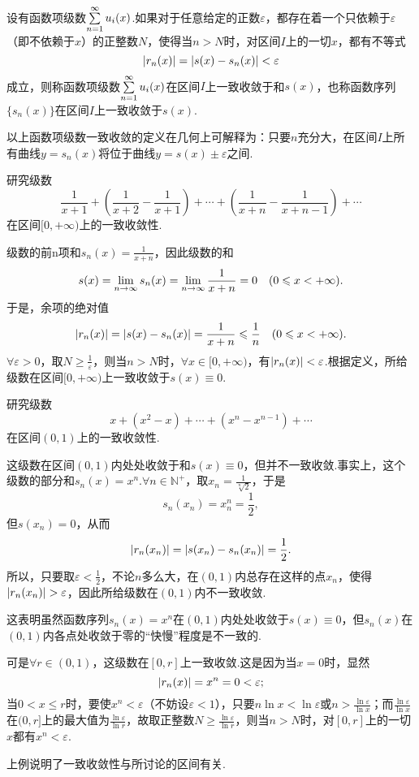 \begin{definition}
设有函数项级数\(\sum\limits_{n=1}^{\infty} u_i(x)\).如果对于任意给定的正数\(\varepsilon\)，都存在着一个只依赖于\(\varepsilon\)（即不依赖于\(x\)）的正整数\(N\)，使得当\(n>N\)时，对区间\(I\)上的一切\(x\)，都有不等式\[
\abs{r_n(x)} = \abs{s(x) - s_n(x)} < \varepsilon
\]成立，则称函数项级数\(\sum\limits_{n=1}^{\infty} u_i(x)\)在区间\(I\)上一致收敛于和\(s(x)\)，也称函数序列\(\{s_n(x)\}\)在区间\(I\)上一致收敛于\(s(x)\).
\end{definition}
以上函数项级数一致收敛的定义在几何上可解释为：只要\(n\)充分大，在区间\(I\)上所有曲线\(y = s_n(x)\)将位于曲线\(y = s(x) \pm \varepsilon\)之间.

\begin{example}
研究级数\[
\frac{1}{x+1} + \left(\frac{1}{x+2}-\frac{1}{x+1}\right)
+ \dotsb + \left(\frac{1}{x+n}-\frac{1}{x+n-1}\right) + \dotsb
\]在区间\([0,+\infty)\)上的一致收敛性.
\begin{solution}
级数的前n项和\(s_n(x) = \frac{1}{x+n}\)，因此级数的和\[
s(x) = \lim\limits_{n\to\infty} s_n(x) = \lim\limits_{n\to\infty} \frac{1}{x+n} = 0
\quad(0 \leqslant x < +\infty).
\]于是，余项的绝对值\[
\abs{r_n(x)} = \abs{s(x) - s_n(x)}
= \frac{1}{x+n} \leqslant \frac{1}{n}
\quad(0 \leqslant x < +\infty).
\]\(\forall\varepsilon>0\)，取\(N \geqslant \frac{1}{\varepsilon}\)，则当\(n>N\)时，\(\forall x\in[0,+\infty)\)，有\(\abs{r_n(x)} < \varepsilon\).根据定义，所给级数在区间\([0,+\infty)\)上一致收敛于\(s(x)\equiv0\).
\end{solution}
\end{example}

\begin{example}
研究级数\[
x + (x^2-x) + \dotsb + (x^n-x^{n-1}) + \dotsb
\]在区间\((0,1)\)上的一致收敛性.
\begin{solution}
这级数在区间\((0,1)\)内处处收敛于和\(s(x)\equiv0\)，但并不一致收敛.事实上，这个级数的部分和\(s_n(x) = x^n\).\(\forall n\in\mathbb{N}^+\)，取\(x_n = \frac{1}{\sqrt[n]{2}}\)，于是\[
s_n(x_n) = x_n^n = \frac{1}{2},
\]但\(s(x_n) = 0\)，从而\[
\abs{r_n(x_n)} = \abs{s(x_n) - s_n(x_n)} = \frac{1}{2}.
\]所以，只要取\(\varepsilon<\frac{1}{2}\)，不论\(n\)多么大，在\((0,1)\)内总存在这样的点\(x_n\)，使得\(\abs{r_n(x_n)}>\varepsilon\)，因此所给级数在\((0,1)\)内不一致收敛.

这表明虽然函数序列\(s_n(x) = x^n\)在\((0,1)\)内处处收敛于\(s(x)\equiv0\)，但\(s_n(x)\)在\((0,1)\)内各点处收敛于零的“快慢”程度是不一致的.

可是\(\forall r\in(0,1)\)，这级数在\([0,r]\)上一致收敛.这是因为当\(x=0\)时，显然\[
\abs{r_n(x)} = x^n = 0 < \varepsilon;
\]当\(0 < x \leqslant r\)时，要使\(x^n < \varepsilon\)（不妨设\(\varepsilon < 1\)），只要\(n \ln x < \ln\varepsilon\)或\(n > \frac{\ln\varepsilon}{\ln x}\)；而\(\frac{\ln\varepsilon}{\ln x}\)在\((0,r]\)上的最大值为\(\frac{\ln\varepsilon}{\ln r}\)，故取正整数\(N \geqslant \frac{\ln\varepsilon}{\ln r}\)，则当\(n > N\)时，对\([0,r]\)上的一切\(x\)都有\(x^n < \varepsilon\).
\end{solution}
\end{example}
上例说明了一致收敛性与所讨论的区间有关.

